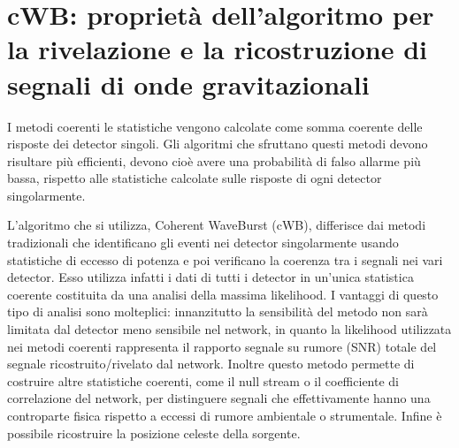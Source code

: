 \chapter[cWB]{cWB: proprietà dell'algoritmo per la rivelazione e la ricostruzione di segnali di onde gravitazionali}
\label{chapter:cwb}

I metodi coerenti le statistiche vengono calcolate come somma coerente delle risposte dei detector singoli. Gli algoritmi che sfruttano questi metodi devono risultare più efficienti, devono cioè avere una probabilità di falso allarme più bassa, rispetto alle statistiche calcolate sulle risposte di ogni detector singolarmente.

L'algoritmo che si utilizza, Coherent WaveBurst (cWB), differisce dai metodi tradizionali che identificano gli eventi nei detector singolarmente usando statistiche di eccesso di potenza e poi verificano la coerenza tra i segnali nei vari detector. Esso utilizza infatti i dati di tutti i detector in un'unica statistica coerente costituita da una analisi della massima likelihood. 
I vantaggi di questo tipo di analisi sono molteplici: innanzitutto la sensibilità del metodo non sarà limitata dal detector meno sensibile nel network, in quanto la likelihood utilizzata nei metodi coerenti rappresenta il rapporto segnale su rumore (SNR) totale del segnale ricostruito/rivelato dal network. Inoltre questo metodo permette di costruire altre statistiche coerenti, come il null stream o il coefficiente di correlazione  del network, per distinguere segnali che effettivamente hanno una controparte fisica rispetto a eccessi di rumore ambientale o strumentale. Infine è possibile ricostruire la posizione celeste della sorgente.
